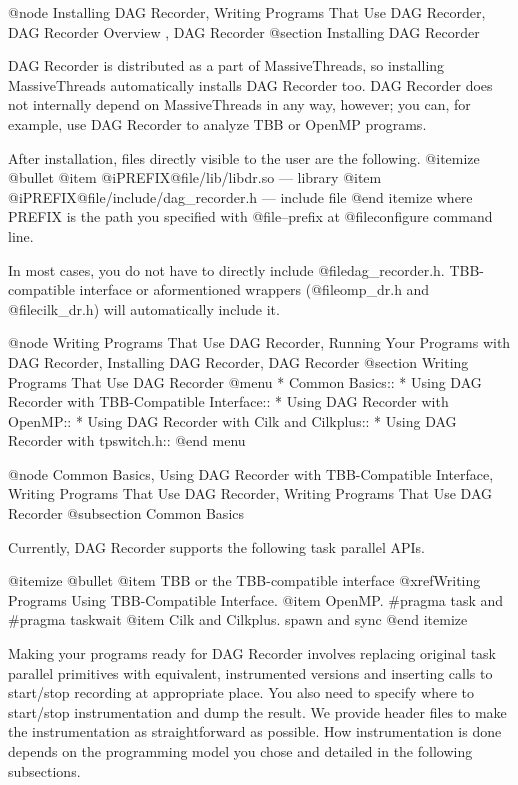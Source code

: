 @node Installing DAG Recorder, Writing Programs That Use DAG Recorder, DAG Recorder Overview , DAG Recorder
@section Installing DAG Recorder

DAG Recorder is distributed as a part of MassiveThreads, so installing
MassiveThreads automatically installs DAG Recorder too.  DAG Recorder
does not internally depend on MassiveThreads in any way, however; you
can, for example, use DAG Recorder to analyze TBB or OpenMP programs.  

After installation, files directly visible to the user are the following.
@itemize @bullet
@item @i{PREFIX}@file{/lib/libdr.so} --- library
@item @i{PREFIX}@file{/include/dag_recorder.h} --- include file
@end itemize
where PREFIX is the path you specified with @file{--prefix} at
@file{configure} command line.  

In most cases, you do not have to directly include
@file{dag_recorder.h}.  TBB-compatible interface or aformentioned
wrappers (@file{omp_dr.h} and @file{cilk_dr.h}) will automatically
include it.

@node Writing Programs That Use DAG Recorder, Running Your Programs with DAG Recorder, Installing DAG Recorder, DAG Recorder
@section Writing Programs That Use DAG Recorder
@menu
* Common Basics::
* Using DAG Recorder with TBB-Compatible Interface::
* Using DAG Recorder with OpenMP::
* Using DAG Recorder with Cilk and Cilkplus::
* Using DAG Recorder with tpswitch.h::
@end menu

@node Common Basics, Using DAG Recorder with TBB-Compatible Interface, Writing Programs That Use DAG Recorder, Writing Programs That Use DAG Recorder
@subsection Common Basics

Currently, DAG Recorder supports the following task parallel APIs.

@itemize @bullet
@item TBB or the TBB-compatible interface @xref{Writing Programs Using TBB-Compatible Interface}.
@item OpenMP. #pragma task and #pragma taskwait
@item Cilk and Cilkplus. spawn and sync
@end itemize

Making your programs ready for DAG Recorder involves replacing original
task parallel primitives with equivalent, instrumented versions and
inserting calls to start/stop recording at appropriate place.  You also
need to specify where to start/stop instrumentation and dump the result.
We provide header files to make the instrumentation as straightforward
as possible.  How instrumentation is done depends on the programming
model you chose and detailed in the following subsections.

